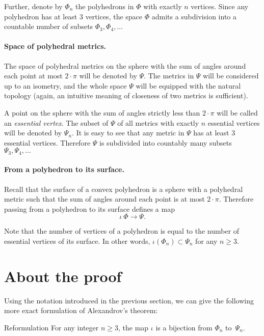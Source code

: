 \documentclass[oneside,a4paper]{article}
\begin{document}
Further, denote by $\Phi_n$ the polyhedrons in $\Phi$ with exactly $n$ vertices.
Since any polyhedron has at least 3 vertices, the space $\Phi$ admits a subdivision into a countable number of subsets $\Phi_3,\Phi_4,\dots$

\paragraph{Space of polyhedral metrics.}
The space of polyhedral metrics on the sphere with the sum of angles around each point at most $2\cdot\pi$ will be denoted by $\Psi$.
The metrics in $\Psi$ will be considered up to an isometry, and the whole space $\Psi$ will be equipped with the natural topology (again, an intuitive meaning of closeness of two metrics is sufficient).

A point on the sphere with the sum of angles strictly less than $2\cdot\pi$ will be called an \emph{essential vertex}.
The subset of $\Psi$ of all metrics with exactly $n$ essential vertices will be denoted by $\Psi_n$.
It is easy to see that any metric in $\Psi$ has at least 3 essential vertices.
Therefore $\Psi$ is subdivided into countably many subsets
 $\Psi_3,\Psi_4,\dots$

\paragraph{From a polyhedron to its surface.}

Recall that the surface of a convex polyhedron is a sphere with a polyhedral metric such that the sum of angles around each point is at most $2\cdot\pi$.
Therefore passing from a polyhedron to its surface defines a map
\[\iota\:\Phi\to \Psi.\]

Note that the number of vertices of a polyhedron is equal to the number of essential vertices of its surface.
In other words, $\iota(\Phi_n)\subset \Psi_n$ for any $n\ge 3$.

\section{About the proof}

Using the notation introduced in the previous section, we can give the following more exact formulation of Alexandrov's theorem: 

\begin{thm}{Reformulation}
For any integer $n\ge 3$,
the map $\iota$ is a bijection from $\Phi_n$ to~$\Psi_n$.
\end{thm}
\end{document}

